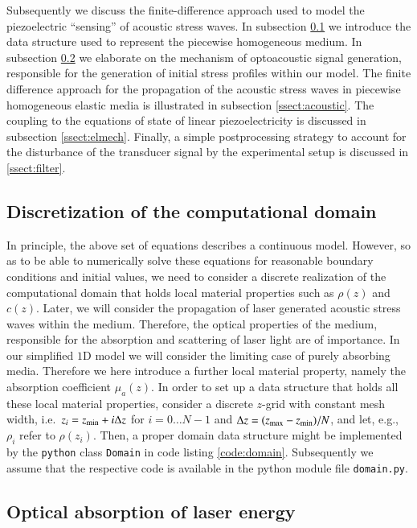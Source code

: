 \documentclass[5p,times,twocolumn]{elsarticle}
\begin{document}
Subsequently we discuss the finite-difference approach used to model the
piezoelectric ``sensing'' of acoustic stress waves. In subsection
\ref{ssect:domain} we introduce the data structure used to represent the
piecewise homogeneous medium. In subsection \ref{ssect:opt} we elaborate on the
mechanism of optoacoustic signal generation, responsible for the generation of
initial stress profiles within our model. The finite difference approach for
the propagation of the acoustic stress waves in piecewise homogeneous elastic
media is illustrated in subsection \ref{ssect:acoustic}. The coupling to the
equations of state of linear piezoelectricity is discussed in subsection
\ref{ssect:elmech}. Finally, a simple postprocessing strategy to account for
the disturbance of the transducer signal by the experimental setup is discussed
in \ref{ssect:filter}.

\subsection{Discretization of the computational domain}
\label{ssect:domain}

In principle, the above set of equations describes a continuous model. However,
so as to be able to numerically solve these equations for reasonable boundary
conditions and initial values, we need to consider a discrete realization of
the computational domain that holds local material properties such as $\rho(z)$
and $c(z)$. 
Later, we will consider the propagation of laser generated acoustic stress
waves within the medium. Therefore, the optical properties of the medium,
responsible for the absorption and scattering of laser light are of importance.
In our simplified $1$D model we will consider the limiting case of purely
absorbing media.  Therefore we here introduce a further local material
property, namely the absorption coefficient $\mu_a(z)$.
In order to set up a data structure that holds all these local material
properties, consider a discrete $z$-grid with constant mesh width, i.e.\ $z_i =
z_{\rm{min}} + i \Delta z$ for $i=0\ldots N-1$ and $\Delta z =
(z_{\rm{max}}-z_{\rm{min}})/N$, and let, e.g., $\rho_i$ refer to $\rho(z_i)$.
Then, a proper domain data structure might be implemented by the {\tt{python}} class
{\tt{Domain}} in code listing \ref{code:domain}. Subsequently we assume that the
respective code is available in the python module file {\tt{domain.py}}.

\subsection{Optical absorption of laser energy}
\label{ssect:opt}
\end{document}
